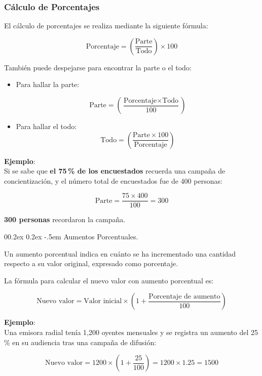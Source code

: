 \documentclass[
  stu,
  floatsintext,
  longtable,
  a4paper,
  nolmodern,
  notxfonts,
  notimes,
  colorlinks=true,linkcolor=blue,citecolor=blue,urlcolor=blue]{apa7}
\makeatletter
\renewcommand{\paragraph}{\@startsection{paragraph}{4}{\parindent}%
	{0\baselineskip \@plus 0.2ex \@minus 0.2ex}%
	{-.5em}%
	{\normalfont\normalsize\bfseries\typesectitle}}
\makeatother
\begin{document}
\subsubsection{Cálculo de Porcentajes}\label{cuxe1lculo-de-porcentajes}

El cálculo de porcentajes se realiza mediante la siguiente fórmula:

\[
\text{Porcentaje} = \left( \frac{\text{Parte}}{\text{Todo}} \right) \times 100
\]

También puede despejarse para encontrar la parte o el todo:

\begin{itemize}
\item
  Para hallar la parte:

  \[
  \text{Parte} = \left( \frac{\text{Porcentaje} \times \text{Todo}}{100} \right)
  \]
\item
  Para hallar el todo: \[
  \text{Todo} = \left( \frac{\text{Parte} \times 100}{\text{Porcentaje}} \right)
  \]
\end{itemize}

\textbf{Ejemplo}:\\
Si se sabe que \textbf{el 75\,\% de los encuestados} recuerda una
campaña de concientización, y el número total de encuestados fue de 400
personas:

\[
\text{Parte} = \frac{75 \times 400}{100} = 300
\]

\textbf{300 personas} recordaron la campaña.

\paragraph{Aumentos Porcentuales.}\label{aumentos-porcentuales}

Un aumento porcentual indica en cuánto se ha incrementado una cantidad
respecto a su valor original, expresado como porcentaje.

La fórmula para calcular el nuevo valor con aumento porcentual es:

\[
\text{Nuevo valor} = \text{Valor inicial} \times \left(1 + \frac{\text{Porcentaje de aumento}}{100} \right)
\]

\textbf{Ejemplo}:\\
Una emisora radial tenía 1,200 oyentes mensuales y se registra un
aumento del 25\,\% en su audiencia tras una campaña de difusión:

\[
\text{Nuevo valor} = 1200 \times \left(1 + \frac{25}{100}\right) = 1200 \times 1.25 = 1500
\]
\end{document}

